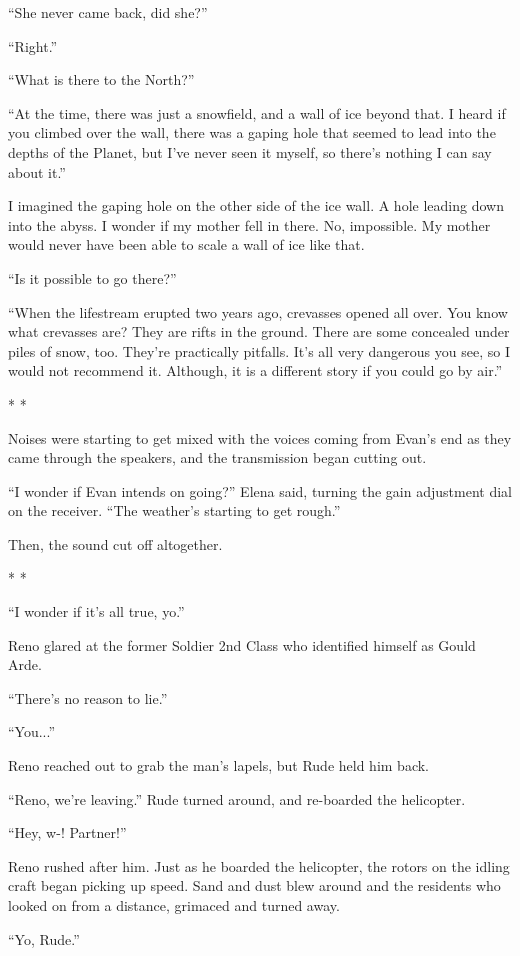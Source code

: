 \documentclass[oneside]{book}
\begin{document}
“She never came back, did she?”

“Right.”

“What is there to the North?”

“At the time, there was just a snowfield, and a wall of ice beyond that. I heard if you climbed over the wall, there was a gaping hole that seemed to lead into the depths of the Planet, but I’ve never seen it myself, so there’s nothing I can say about it.”

I imagined the gaping hole on the other side of the ice wall. A hole leading down into the abyss. I wonder if my mother fell in there. No, impossible. My mother would never have been able to scale a wall of ice like that.

“Is it possible to go there?”

“When the lifestream erupted two years ago, crevasses opened all over. You know what crevasses are? They are rifts in the ground. There are some concealed under piles of snow, too. They’re practically pitfalls. It’s all very dangerous you see, so I would not recommend it. Although, it is a different story if you could go by air.”

* *

Noises were starting to get mixed with the voices coming from Evan’s end as they came through the speakers, and the transmission began cutting out.

“I wonder if Evan intends on going?” Elena said, turning the gain adjustment dial on the receiver. “The weather’s starting to get rough.”

Then, the sound cut off altogether.

* *

“I wonder if it’s all true, yo.”

Reno glared at the former Soldier 2nd Class who identified himself as Gould Arde.

“There’s no reason to lie.”

“You...”

Reno reached out to grab the man’s lapels, but Rude held him back.

“Reno, we’re leaving.” Rude turned around, and re-boarded the helicopter.

“Hey, w-! Partner!”

Reno rushed after him. Just as he boarded the helicopter, the rotors on the idling craft began picking up speed. Sand and dust blew around and the residents who looked on from a distance, grimaced and turned away.

“Yo, Rude.”
\end{document}
